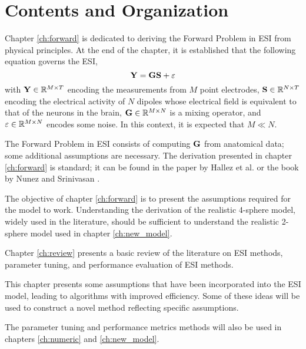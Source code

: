 \section{Contents and Organization}

Chapter \ref{ch:forward} is dedicated to deriving the Forward Problem in ESI from physical principles.
%
At the end of the chapter, it is established that the following equation governs the ESI,
\begin{equation*}
    \mathbf{Y} = \mathbf{G} \mathbf{S} +\varepsilon
\end{equation*}
with $\mathbf{Y}\in \mathbb{R}^{M\times T}$ encoding the measurements from $M$ point electrodes, $\mathbf{S} \in \mathbb{R}^{N\times T}$ encoding the electrical activity of $N$ dipoles whose electrical field is equivalent to that of the neurons in the brain, $\mathbf{G} \in \mathbb{R}^{M\times N}$ is a mixing operator, and $\varepsilon \in \mathbb{R}^{M\times N}$ encodes some noise.
%
In this context, it is expected that $M\ll N$.

The Forward Problem in ESI consists of computing $\mathbf{G}$ from anatomical data; some additional assumptions are necessary.
%
%
The derivation presented in chapter \ref{ch:forward} is standard; it can be found in the paper by Hallez et al. \cite{hallez2007review} or the book by Nunez and Srinivasan \cite{nunez2006electric}.

The objective of chapter \ref{ch:forward} is to present the assumptions required for the model to work.
%
Understanding the derivation of the realistic 4-sphere model, widely used in the literature, should be sufficient to understand the realistic 2-sphere model used in chapter \ref{ch:new_model}.

%

Chapter \ref{ch:review} presents a basic review of the literature on ESI methods, parameter tuning, and performance evaluation of ESI methods.


This chapter presents some assumptions that have been incorporated into the ESI model, leading to algorithms with improved efficiency.
%
Some of these ideas will be used to construct a novel method reflecting specific assumptions.

The parameter tuning and performance metrics methods will also be used in chapters \ref{ch:numeric} and \ref{ch:new_model}.

